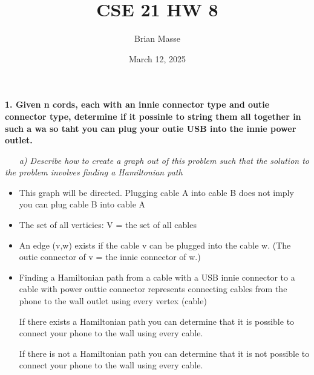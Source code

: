 \documentclass[12pt, letterpaper]{article}
\title{CSE 21 HW 8}
\author{Brian Masse}
\date{March 12, 2025}
\begin{document}
\maketitle
\newpage

\bf{ 1. Given n cords, each with an innie connector type and outie connector type, determine if it possinle to string them all together in such a wa so taht you can plug your outie USB into the innie power outlet. }

\-\ \newline
\-\ \it{ a) Describe how to create a graph out of this problem such that the solution to the problem involves finding a Hamiltonian path }

\begin{itemize}
\item \textnormal{This graph will be directed. Plugging cable A into cable B does not imply you can plug cable B into cable A}
\item \textnormal{The set of all verticies: V = the set of all cables}
\item \textnormal{An edge (v,w) exists if the cable v can be plugged into the cable w. (The outie connector of v = the innie connector of w.)}
\item \textnormal{Finding a Hamiltonian path from a cable with a USB innie connector to a cable with power outtie connector represents connecting cables from the phone to the wall outlet using every vertex (cable)} \newline

\textnormal{If there exists a Hamiltonian path you can determine that it is possible to connect your phone to the wall using every cable. } \newline

\textnormal{If there is not a Hamiltonian path you can determine that it is not possible to connect your phone to the wall using every cable. }

\end{itemize}
\end{document}
